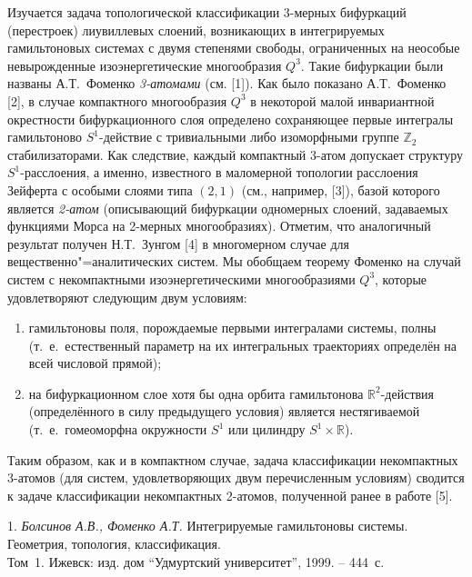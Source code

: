 \vzmscaption

Изучается задача топологической классификации 3-мер\-ных бифуркаций (перестроек) лиувиллевых слоений, возникающих в интегрируемых гамильтоновых системах с двумя степенями свободы, ограниченных на неособые невырожденные изоэнергетические многообразия $Q^3$. Такие бифуркации были названы А.Т.~Фоменко {\it 3-атомами} (см. [1]). Как было показано А.Т.~Фоменко [2], в случае компактного многообразия $Q^3$ в некоторой малой инвариантной окрестности бифуркационного слоя определено сохраняющее первые интегралы гамильтоново $S^1$-действие с тривиальными либо изоморфными группе $\mathbb Z_2$ стабилизаторами. Как следствие, каждый компактный 3-атом допускает структуру $S^1$-расслоения, а именно, известного в маломерной топологии расслоения Зейферта с особыми слоями типа $(2,1)$ (см., например, [3]), базой которого является {\it 2-атом} (описывающий бифуркации одномерных слоений, задаваемых функциями Морса на 2-мерных многообразиях). Отметим, что аналогичный результат получен Н.Т.~Зунгом [4] в многомерном случае для вещественно"=аналитических систем. Мы обобщаем теорему Фоменко на случай систем с некомпактными изоэнергетическими многообразиями $Q^3$, которые удовлетворяют следующим двум условиям:
\begin{enumerate}
	\item гамильтоновы поля, порождаемые первыми интегралами системы, полны (т.~е.~естественный параметр на их интегральных траекториях определён на всей числовой прямой);
	\item на бифуркационном слое хотя бы одна орбита гамильтонова $\mathbb R^2$-действия (определённого в силу предыдущего условия) является нестягиваемой (т.~е.~гомеоморфна окружности $S^1$ или цилиндру $S^1\times\mathbb R$).
\end{enumerate}
Таким образом, как и в компактном случае, задача классификации некомпактных 3-атомов (для систем, удовлетворяющих двум перечисленным условиям) сводится к задаче классификации некомпактных 2-атомов, полученной ранее в работе [5].



\litlist

1. {\it Болсинов А.В., Фоменко А.Т.} Интегрируемые гамильтоновы системы. Геометрия, топология, классификация. \\ Том~1. Ижевск: изд. дом ``Удмуртский университет'', 1999. -- 444~с.


